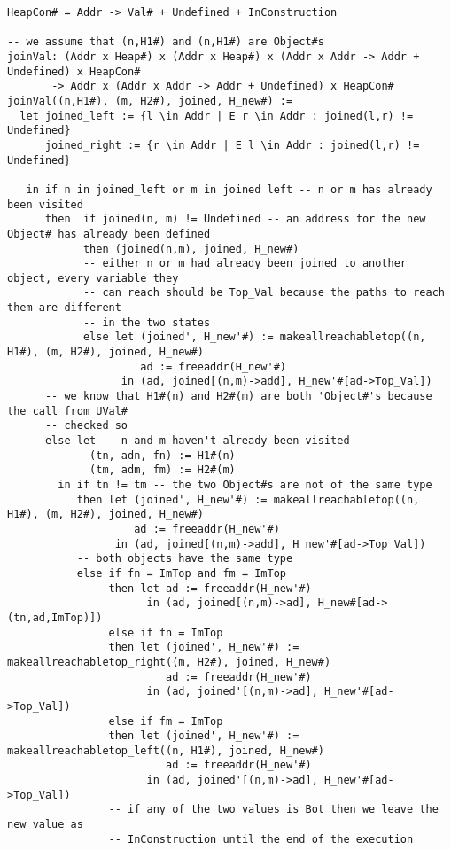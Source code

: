 \begin{verbatim}
HeapCon# = Addr -> Val# + Undefined + InConstruction

-- we assume that (n,H1#) and (n,H1#) are Object#s
joinVal: (Addr x Heap#) x (Addr x Heap#) x (Addr x Addr -> Addr + Undefined) x HeapCon#
       -> Addr x (Addr x Addr -> Addr + Undefined) x HeapCon#
joinVal((n,H1#), (m, H2#), joined, H_new#) :=
  let joined_left := {l \in Addr | E r \in Addr : joined(l,r) != Undefined}
      joined_right := {r \in Addr | E l \in Addr : joined(l,r) != Undefined}

   in if n in joined_left or m in joined left -- n or m has already been visited
      then  if joined(n, m) != Undefined -- an address for the new Object# has already been defined
            then (joined(n,m), joined, H_new#)
            -- either n or m had already been joined to another object, every variable they
            -- can reach should be Top_Val because the paths to reach them are different
            -- in the two states
            else let (joined', H_new'#) := makeallreachabletop((n, H1#), (m, H2#), joined, H_new#)
                     ad := freeaddr(H_new'#)
                  in (ad, joined[(n,m)->add], H_new'#[ad->Top_Val])
      -- we know that H1#(n) and H2#(m) are both 'Object#'s because the call from UVal#
      -- checked so
      else let -- n and m haven't already been visited
             (tn, adn, fn) := H1#(n)
             (tm, adm, fm) := H2#(m)
        in if tn != tm -- the two Object#s are not of the same type
           then let (joined', H_new'#) := makeallreachabletop((n, H1#), (m, H2#), joined, H_new#)
                    ad := freeaddr(H_new'#)
                 in (ad, joined[(n,m)->add], H_new'#[ad->Top_Val])
           -- both objects have the same type
           else if fn = ImTop and fm = ImTop
                then let ad := freeaddr(H_new'#)
                      in (ad, joined[(n,m)->ad], H_new#[ad->(tn,ad,ImTop)])
                else if fn = ImTop
                then let (joined', H_new'#) := makeallreachabletop_right((m, H2#), joined, H_new#)
                         ad := freeaddr(H_new'#)
                      in (ad, joined'[(n,m)->ad], H_new'#[ad->Top_Val])
                else if fm = ImTop
                then let (joined', H_new'#) := makeallreachabletop_left((n, H1#), joined, H_new#)
                         ad := freeaddr(H_new'#)
                      in (ad, joined'[(n,m)->ad], H_new'#[ad->Top_Val])
                -- if any of the two values is Bot then we leave the new value as
                -- InConstruction until the end of the execution

\end{verbatim}

